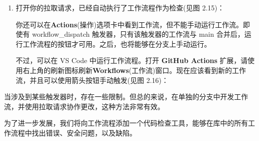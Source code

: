 \begin{enumerate}
\begin{shell}
$ git push -u origin new-workflow
\end{shell}

\item 
接下来，我们将为新分支创建一个拉取请求。因为使用了 pull\_request 触发器，这将自动运行新工作流。在浏览器中转到库并导航到 \textbf{Pull requests}(拉取请求)。Git 检测到已经推送了一个新分支，并会提供给创建拉取请求的选项(比较 \& 拉取请求，见图 2.13)：

\myGraphic{0.6}{content/chapter2/images/13.png}{图2.13 --- 浏览器中创建一个新的拉取请求}

只需保留默认标题(你之前添加的提交信息)然后点击 、\textbf{Create pull request}(创建拉取请求)(见图 2.14)：

\myGraphic{0.6}{content/chapter2/images/14.png}{图2.14 --- 创建一个带有标题和描述的拉取请求}

也可以使用 GitHub CLI 创建拉取请求：

\begin{shell}
$ gh pr create --fill
\end{shell}

\begin{myTip}{GitHub CLI}
在本书中，将大量使用 GitHub CLI (\url{https://cli.github.com/})，其适用于所有平台，可以通过许多包管理器(Homebrew、WinGet、RPM 等)获取。有关更多安装说明，请参阅 \url{https://github.com/cli/cli#installation}。安装后，需要使用 \verb|gh auth login| 进行身份验证(请参阅 \url{https://cli.github.com/manual/gh_auth_login})。
\end{myTip}

\item 
打开你的拉取请求，已经自动执行了工作流程作为检查(见图 2.15)：


你还可以在\textbf{Actions}(操作)选项卡中看到工作流，但不能手动运行工作流。即使有 workflow\_dispatch 触发器，只有该触发器的工作流与 main 合并后，运行工作流程的按钮才可用。之后，也将能够在分支上手动运行。

不过，可以在 VS Code 中运行工作流程。打开 \textbf{GitHub Actions} 扩展，请使用右上角的刷新图标刷新\textbf{Workflows}(工作流)窗口。现在应该看到新的工作流，并且可以使用箭头按钮手动触发(见图 2.16)：

\end{enumerate}


当涉及到某些触发器时，存在一些限制。但总的来说，在单独的分支中开发工作流，并使用拉取请求协作更改，这种方法非常有效。


为了进一步发展，我们将向工作流程添加一个代码检查工具，能够在库中的所有工作流程中找出错误、安全问题，以及缺陷。
